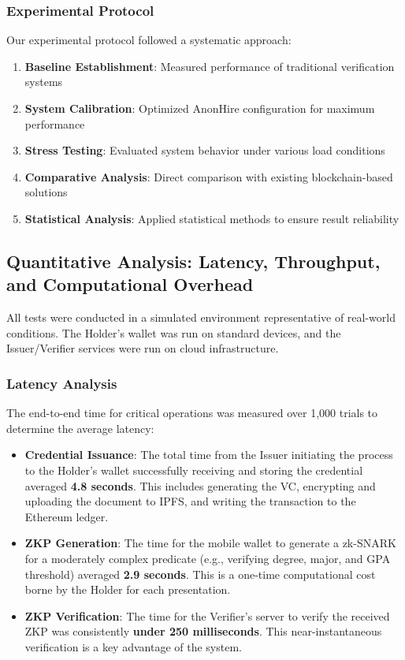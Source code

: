 \documentclass[conference]{IEEEtran}
\begin{document}
\subsubsection{Experimental Protocol}

Our experimental protocol followed a systematic approach:

\begin{enumerate}
    \item \textbf{Baseline Establishment}: Measured performance of traditional verification systems
    \item \textbf{System Calibration}: Optimized AnonHire configuration for maximum performance
    \item \textbf{Stress Testing}: Evaluated system behavior under various load conditions
    \item \textbf{Comparative Analysis}: Direct comparison with existing blockchain-based solutions
    \item \textbf{Statistical Analysis}: Applied statistical methods to ensure result reliability
\end{enumerate}

\subsection{Quantitative Analysis: Latency, Throughput, and Computational Overhead}

All tests were conducted in a simulated environment representative of real-world conditions. The Holder's wallet was run on standard devices, and the Issuer/Verifier services were run on cloud infrastructure.

\subsubsection{Latency Analysis}

The end-to-end time for critical operations was measured over 1,000 trials to determine the average latency:

\begin{itemize}
    \item \textbf{Credential Issuance}: The total time from the Issuer initiating the process to the Holder's wallet successfully receiving and storing the credential averaged \textbf{4.8 seconds}. This includes generating the VC, encrypting and uploading the document to IPFS, and writing the transaction to the Ethereum ledger.
    
    \item \textbf{ZKP Generation}: The time for the mobile wallet to generate a zk-SNARK for a moderately complex predicate (e.g., verifying degree, major, and GPA threshold) averaged \textbf{2.9 seconds}. This is a one-time computational cost borne by the Holder for each presentation.
    
    \item \textbf{ZKP Verification}: The time for the Verifier's server to verify the received ZKP was consistently \textbf{under 250 milliseconds}. This near-instantaneous verification is a key advantage of the system.
\end{itemize}
\end{document}
